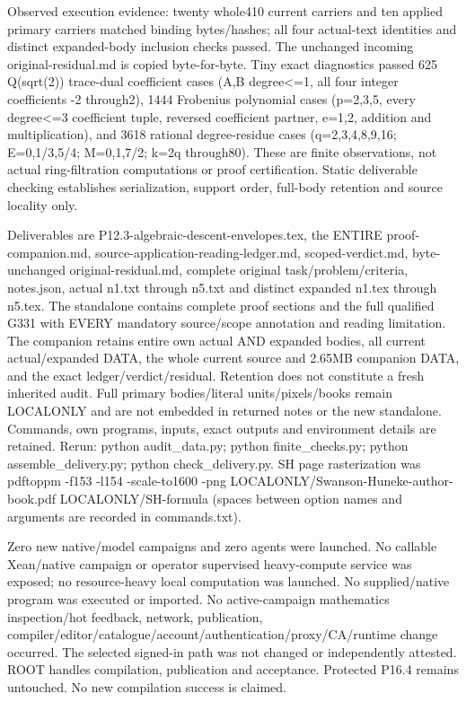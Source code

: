 \documentclass[11pt]{article}
\begin{document}
Observed execution evidence: twenty whole410 current carriers and ten applied primary carriers matched binding bytes/hashes; all four actual-text identities and distinct expanded-body inclusion checks passed. The unchanged incoming original-residual.md is copied byte-for-byte. Tiny exact diagnostics passed 625 Q(sqrt(2)) trace-dual coefficient cases (A,B degree\textless{}=1, all four integer coefficients -2 through2), 1444 Frobenius polynomial cases (p=2,3,5, every degree\textless{}=3 coefficient tuple, reversed coefficient partner, e=1,2, addition and multiplication), and 3618 rational degree-residue cases (q=2,3,4,8,9,16; E=0,1/3,5/4; M=0,1,7/2; k=2q through80). These are finite observations, not actual ring-filtration computations or proof certification. Static deliverable checking establishes serialization, support order, full-body retention and source locality only.

Deliverables are P12.3-algebraic-descent-envelopes.tex, the ENTIRE proof-companion.md, source-application-reading-ledger.md, scoped-verdict.md, byte-unchanged original-residual.md, complete original task/problem/criteria, notes.json, actual n1.txt through n5.txt and distinct expanded n1.tex through n5.tex. The standalone contains complete proof sections and the full qualified G331 with EVERY mandatory source/scope annotation and reading limitation. The companion retains entire own actual AND expanded bodies, all current actual/expanded DATA, the whole current source and 2.65MB companion DATA, and the exact ledger/verdict/residual. Retention does not constitute a fresh inherited audit. Full primary bodies/literal units/pixels/books remain LOCALONLY and are not embedded in returned notes or the new standalone. Commands, own programs, inputs, exact outputs and environment details are retained. Rerun: python audit\_data.py; python finite\_checks.py; python assemble\_delivery.py; python check\_delivery.py. SH page rasterization was pdftoppm -f153 -l154 -scale-to1600 -png LOCALONLY/Swanson-Huneke-author-book.pdf LOCALONLY/SH-formula (spaces between option names and arguments are recorded in commands.txt).

Zero new native/model campaigns and zero agents were launched. No callable Xean/native campaign or operator supervised heavy-compute service was exposed; no resource-heavy local computation was launched. No supplied/native program was executed or imported. No active-campaign mathematics inspection/hot feedback, network, publication, compiler/editor/catalogue/account/authentication/proxy/CA/runtime change occurred. The selected signed-in path was not changed or independently attested. ROOT handles compilation, publication and acceptance. Protected P16.4 remains untouched. No new compilation success is claimed.
\end{document}
